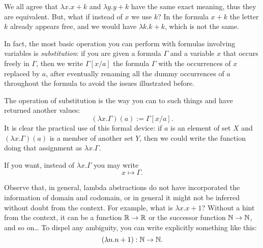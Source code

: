 \begin{example}
We all agree that \(\lambda x . x+k\) and \(\lambda y . y+k\) have the same exact meaning, thus they are equivalent. But, what if instead of \(x\) we use \(k\)? In the formula \(x+k\) the letter \(k\) already appears free, and we would have \(\lambda k . k+k\), which is not the same.
\end{example}

In fact, the most basic operation you can perform with formulas involving variables is {\em substitution}: if you are given a formula \(\Gamma\) and a variable \(x\) that occurs freely in \(\Gamma\), then we write \(\Gamma[x/a]\) the formula \(\Gamma\) with the occurrences of \(x\) replaced by \(a\), after eventually renaming all the dummy occurrences of \(a\) throughout the formula to avoid the issues illustrated before.

The operation of substitution is the way you can  to such things and have returned another values:
\[(\lambda x . \Gamma) (a) := \Gamma[x/a] .\]
It is clear the practical use of this formal device: if \(a\) is an element of set \(X\) and \(\left( \lambda x . \Gamma \right)(a)\) is a member of another set \(Y\), then we could write the function doing that assignment as \(\lambda x . \Gamma\).

If you want, instead of \(\lambda x . \Gamma\) you may write
\[x \mapsto \Gamma .\]

Observe that, in general, lambda abstractions do not have incorporated the information of domain and codomain, or in general it might not be inferred without doubt from the context. For example, what is \(\lambda x . x+1\)? Without a hint from the context, it can be a function \(\mathbb R \to \mathbb R\) or the successor function \(\mathbb N \to \mathbb N\), and so on\dots{} To dispel any ambiguity, you can write explicitly something like this:
\[(\lambda n . n+1) : \mathbb N \to \mathbb N .\]


